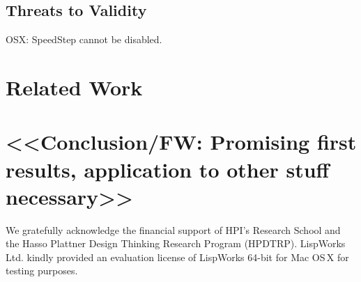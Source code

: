 \documentclass[preprint,english,10pt,nonatbib]{sigplanconf}
\begin{document}
\subsection{Threats to Validity}

OSX: SpeedStep cannot be disabled.

\section{Related Work}

\section{<<Conclusion/FW: Promising first results, application to other stuff necessary>>}

\acks
We gratefully acknowledge the financial support of HPI's Research School and
the Hasso Plattner Design Thinking Research Program (HPDTRP).
LispWorks Ltd. kindly provided an evaluation license of
LispWorks\textsuperscript{\textregistered} 64-bit for Mac OS\,X for testing
purposes.

\printbibliography

\end{document}

